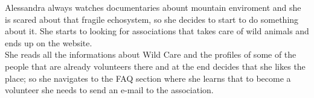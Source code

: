 Alessandra always watches documentaries abount mountain enviroment and she is scared about that fragile echosystem, so she decides to start to do something about it. She starts to looking for associations that takes care of wild animals and ends up on the website. \\
She reads all the informations about Wild Care and the profiles of some of the people that are already volunteers there and at the end decides that she likes the place; so she navigates to the FAQ section where she learns that to become a volunteer she needs to send an e-mail to the association.